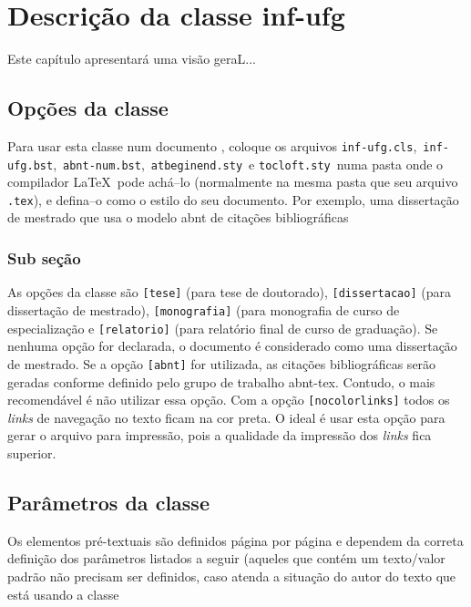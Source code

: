 \chapter{Descrição da classe \textsf{inf-ufg}}
\label{cap:theory}

Este capítulo apresentará uma visão geraL...

\section{Opções da classe}
\label{sec:http2}

Para usar esta classe num documento \LaTeXe, coloque os arquivos 
\verb|inf-ufg.cls|,\ \verb|inf-ufg.bst|,\ \verb|abnt-num.bst|,\ \verb|atbeginend.sty|\ e \verb|tocloft.sty|\ numa pasta onde o compilador \LaTeX\ pode achá--lo (normalmente na mesma pasta que seu arquivo \verb|.tex|), e defina--o como o estilo do seu documento. Por exemplo, uma dissertação de mestrado que usa o modelo abnt de citações bibliográficas

\subsection{Sub seção}
\label{subsec:framing}

As opções da classe são \verb|[tese]| (para tese de doutorado), \verb|[dissertacao]| (para dissertação de mestrado), \verb|[monografia]| (para monografia de curso de especialização e \verb|[relatorio]| (para relatório final de curso de graduação). Se nenhuma opção for declarada, o documento é considerado como uma dissertação de mestrado. Se a opção \verb|[abnt]| for utilizada, as citações bibliográficas serão geradas conforme definido pelo grupo de trabalho \textsf{abnt-tex}. Contudo, o mais recomendável é não utilizar essa opção. Com a opção \verb|[nocolorlinks]| todos os {\em links} de navegação no texto ficam na cor preta. O ideal é usar esta opção para gerar o arquivo para impressão, pois a qualidade da impressão dos {\em links} fica superior.


\section{Parâmetros da classe}
\label{sec:lua}

Os elementos pré-textuais são definidos página por página e dependem da correta definição dos parâmetros listados a seguir (aqueles que contém um texto/valor padrão não precisam ser definidos, caso atenda a situação do autor do texto que está usando a classe
